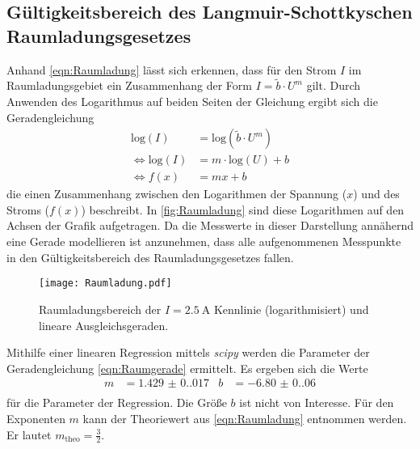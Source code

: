 \subsection{Gültigkeitsbereich des Langmuir-Schottkyschen Raumladungsgesetzes}
\label{subsec:A_Raumladung}
Anhand \autoref{eqn:Raumladung} lässt sich erkennen, dass für den Strom $I$ im Raumladungsgebiet ein Zusammenhang der Form $I = \tilde{b} \cdot U^m$ gilt. Durch Anwenden des 
Logarithmus auf beiden Seiten der Gleichung ergibt sich die Geradengleichung
\begin{align}
  \label{eqn:Raumgerade}
  \mathrm{log}(I) &= \mathrm{log}\left(\tilde{b} \cdot U^m \right) \nonumber \\
  \Leftrightarrow \mathrm{log}(I) &= m \cdot \mathrm{log}(U) + b   \nonumber \\ 
  \Leftrightarrow f(x) &= mx + b
\end{align}
die einen Zusammenhang zwischen den Logarithmen der Spannung ($x$) und des Stroms ($f(x)$) beschreibt. In \autoref{fig:Raumladung} sind diese Logarithmen auf den Achsen der 
Grafik aufgetragen.
Da die Messwerte in dieser Darstellung annähernd eine Gerade modellieren ist anzunehmen, dass alle aufgenommenen Messpunkte in den Gültigkeitsbereich des Raumladungsgesetzes
fallen.

\begin{figure}
  \centering
  \texttt{[image: Raumladung.pdf]}
  \caption{Raumladungsbereich der $I = \qty{2.5}{\ampere}$ Kennlinie (logarithmisiert) und lineare Ausgleichsgeraden.}
  \label{fig:Raumladung}
\end{figure}

Mithilfe einer linearen Regression mittels \textit{scipy} \cite{scipy} werden die Parameter der Geradengleichung \eqref{eqn:Raumgerade} ermittelt. 
Es ergeben sich die Werte
\begin{align*}
  \label{eqn:Parameter1}
  m &= \num{1.429(0.017)} & b &= \num{-6.80(0.06)} \\
\end{align*}
für die Parameter der Regression. Die Größe $b$ ist nicht von Interesse. Für den Exponenten $m$ kann der Theoriewert aus \autoref{eqn:Raumladung} entnommen werden. Er lautet
$m_\text{theo} = \frac{3}{2}$.

